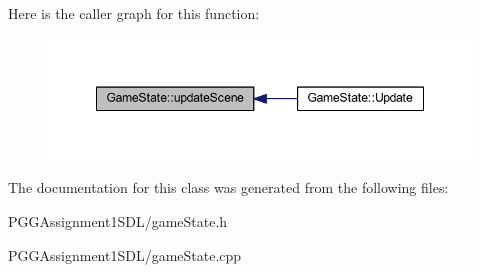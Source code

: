 Here is the caller graph for this function\+:
\nopagebreak
\begin{figure}[H]
\begin{center}
\leavevmode
\includegraphics[width=348pt]{class_game_state_ab22e8c062ae3d629044b93faba688974_icgraph}
\end{center}
\end{figure}




The documentation for this class was generated from the following files\+:\begin{DoxyCompactItemize}
\item 
P\+G\+G\+Assignment1\+S\+D\+L/game\+State.\+h\item 
P\+G\+G\+Assignment1\+S\+D\+L/game\+State.\+cpp\end{DoxyCompactItemize}
